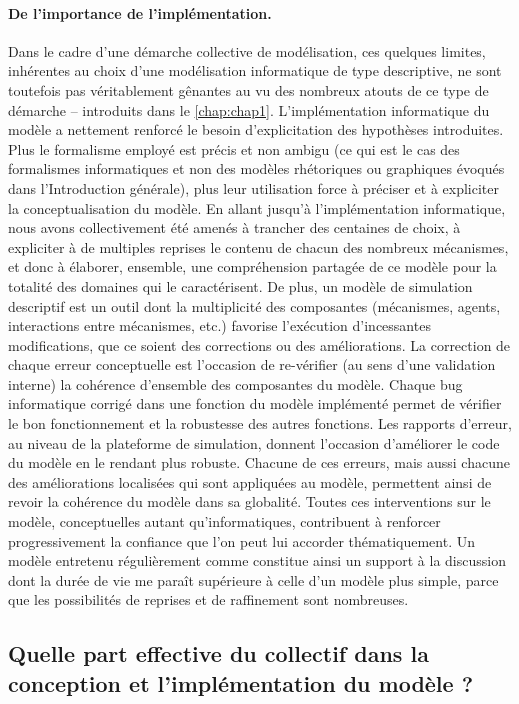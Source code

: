 \paragraph{De l'importance de l'implémentation.}
Dans le cadre d'une démarche collective de modélisation, ces quelques limites, inhérentes au choix d'une modélisation informatique de type descriptive, ne sont toutefois pas véritablement gênantes au vu des nombreux atouts de ce type de démarche -- introduits dans le \cref{chap:chap1}.
L'implémentation informatique du modèle a nettement renforcé le besoin d'explicitation des hypothèses introduites.
Plus le formalisme employé est précis et non ambigu (ce qui est le cas des formalismes informatiques et non des modèles \og rhétoriques\fg{} ou \og graphiques\fg{} évoqués dans l'Introduction générale), plus leur utilisation force à préciser et à expliciter la conceptualisation du modèle.
En allant jusqu'à l'implémentation informatique, nous avons collectivement été amenés à trancher des centaines de choix, à expliciter à de multiples reprises le contenu de chacun des nombreux mécanismes, et donc à élaborer, ensemble, une compréhension partagée de ce modèle pour la totalité des domaines qui le caractérisent.
De plus, un modèle de simulation descriptif est un outil dont la multiplicité des composantes (mécanismes, agents, interactions entre mécanismes, etc.) favorise l'exécution d'incessantes modifications, que ce soient des corrections ou des améliorations.
La correction de chaque erreur conceptuelle est l'occasion de re-vérifier (au sens d'une validation interne) la cohérence d'ensemble des composantes du modèle.
Chaque bug informatique corrigé dans une fonction du modèle implémenté permet de vérifier le bon fonctionnement et la robustesse des autres fonctions.
Les rapports d'erreur, au niveau de la plateforme de simulation, donnent l'occasion d'améliorer le code du modèle en le rendant plus robuste.
Chacune de ces erreurs, mais aussi chacune des améliorations localisées qui sont appliquées au modèle, permettent ainsi de revoir la cohérence du modèle dans sa globalité.
Toutes ces interventions sur le modèle, conceptuelles autant qu'informatiques, contribuent à renforcer progressivement la confiance que l'on peut lui accorder thématiquement. Un modèle \og entretenu régulièrement\fg{} comme \simfeodal{} constitue ainsi un support à la discussion dont la \og durée de vie\fg{} me paraît supérieure à celle d'un modèle plus simple, parce que les possibilités de reprises et de raffinement sont nombreuses.

\subsection{Quelle part effective du collectif dans la conception et l'implémentation du modèle ?}

